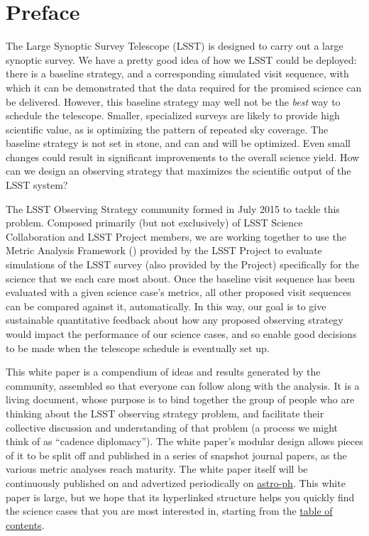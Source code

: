 \setcounter{chapter}{0}
\chapter*{Preface}
\def\chpname{preface}\label{chp:\chpname}
\markboth{}{}

\noindent The Large Synoptic Survey Telescope (LSST) is designed to
carry out a large synoptic survey.  We have a pretty good idea of how we
LSST could be deployed: there is a baseline strategy, and a
corresponding simulated visit sequence, with which it can be
demonstrated that the data required for the promised science can be
delivered. However, this baseline strategy may well not be the {\it
best} way to schedule the telescope. Smaller, specialized surveys are
likely to provide high scientific value, as is optimizing the pattern of
repeated sky coverage.  The baseline strategy is not set in stone, and
can and will be optimized. Even small changes could result in
significant improvements to the overall science yield. How can we design
an observing strategy that maximizes the scientific output of the LSST
system?

\noindent The LSST Observing Strategy community formed in July 2015 to
tackle this problem. Composed primarily (but not exclusively) of  LSST
Science Collaboration and LSST Project members, we are working together
to use the Metric Analysis Framework (\MAF) provided by the LSST Project
to evaluate \OpSim simulations of the LSST survey (also provided by the
Project) specifically for the science that we each care most about. Once
the baseline visit sequence has been evaluated with a given science
case's metrics, all other proposed visit sequences can be compared
against it, automatically. In this way, our goal is to give sustainable
quantitative feedback about how any proposed observing strategy would
impact the performance of our science cases, and so enable good
decisions to be made when the telescope schedule is eventually set up.

\noindent This white paper is a compendium of ideas and results
generated by the community, assembled so that everyone can follow along
with the analysis. It is a living document, whose purpose is to bind
together the group of people who are thinking about the LSST observing
strategy problem, and facilitate their collective discussion and
understanding of that problem (a process we might think of as  ``cadence
diplomacy''). The white paper's modular design allows pieces of it to be
split off and published in a series of snapshot journal papers, as the
various metric analyses reach maturity. The white paper itself will be
continuously published on
\href{https://github.com/LSSTScienceCollaborations/ObservingStrategy}{\GitHub}
and advertized periodically on \href{http://arxiv.org}{astro-ph}. This
white paper is large, but we hope that its hyperlinked structure helps
you quickly find the science cases that you are most interested in,
starting from the \hyperref[toc]{table of contents}.

